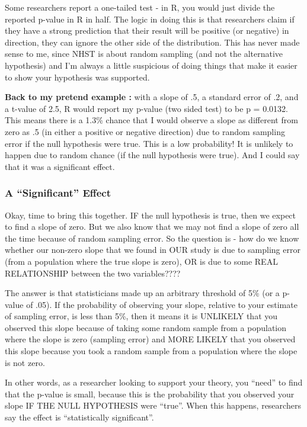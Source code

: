 \documentclass[
  letterpaper,
  DIV=11,
  numbers=noendperiod,
  oneside]{scrreprt}
\begin{document}
Some researchers report a one-tailed test - in R, you would just divide
the reported p-value in R in half. The logic in doing this is that
researchers claim if they have a strong prediction that their result
will be positive (or negative) in direction, they can ignore the other
side of the distribution. This has never made sense to me, since NHST is
about random sampling (and not the alternative hypothesis) and I'm
always a little suspicious of doing things that make it easier to show
your hypothesis was supported.

\hfill\break
\textbf{Back to my pretend example :} with a slope of .5, a standard
error of .2, and a t-value of 2.5, R would report my p-value (two sided
test) to be p = 0.0132. This means there is a 1.3\% chance that I would
observe a slope as different from zero as .5 (in either a positive or
negative direction) due to random sampling error if the null hypothesis
were true. This is a low probability! It is unlikely to happen due to
random chance (if the null hypothesis were true). And I could say that
it was a significant effect.

\subsubsection{\texorpdfstring{\textbf{A ``Significant''
Effect}}{A ``Significant'' Effect}}\label{a-significant-effect}

Okay, time to bring this together. IF the null hypothesis is true, then
we expect to find a slope of zero. But we also know that we may not find
a slope of zero all the time because of random sampling error. So the
question is - how do we know whether our non-zero slope that we found in
OUR study is due to sampling error (from a population where the true
slope is zero), OR is due to some REAL RELATIONSHIP between the two
variables????~

The answer is that statisticians made up an arbitrary threshold of 5\%
(or a p-value of .05). If the probability of observing your slope,
relative to your estimate of sampling error, is less than 5\%, then it
means it is UNLIKELY that you observed this slope because of taking some
random sample from a population where the slope is zero (sampling error)
and MORE LIKELY that you observed this slope because you took a random
sample from a population where the slope is not zero.~

In other words, as a researcher looking to support your theory, you
``need'' to find that the p-value is small, because this is the
probability that you observed your slope IF THE NULL HYPOTHESIS were
``true''. When this happens, researchers say the effect is
``statistically significant''.~
\end{document}
